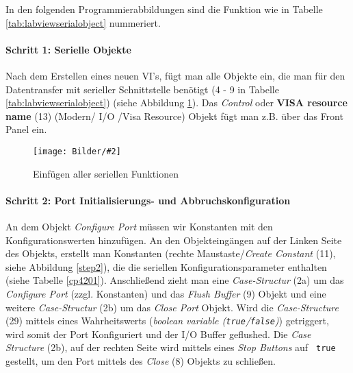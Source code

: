 \documentclass[
fontsize=12pt, 
paper=a4, 
BCOR=10mm, 
twoside=false,
 DIV=10, 
 headsepline, 
 footsepline
 ]{scrartcl}
\def\bild#1#2#3#4#5#6{%
\begin{figure}[h!] %
\centering
\texttt{[image: Bilder/\#2]}
\vspace{#3}
\caption[#4]{#5}\label{#6}
\end{figure}
}
\begin{document}





In den folgenden Programmierabbildungen sind die Funktion wie in Tabelle \ref{tab:labviewserialobject} nummeriert.

\paragraph{Schritt 1: Serielle Objekte} Nach dem Erstellen eines neuen VI's, fügt man alle Objekte ein, die man für den Datentransfer mit serieller Schnittstelle benötigt (4 - 9 in Tabelle \ref{tab:labviewserialobject}) (siehe Abbildung \ref{step1}). Das \textit{Control} oder \textbf{VISA resource name} (13) (Modern/ I/O /Visa Resource) Objekt fügt man z.B. über das Front Panel ein. 

\bild{1}
{LabVIEW_serialport/step_1_all_serial_functions_2.png}
{0em}
{Einfügen aller seriellen Funktionen}
{Einfügen aller seriellen Funktionen}
{step1}


\paragraph{Schritt 2: Port Initialisierungs- und Abbruchskonfiguration} An dem Objekt \textit{Configure Port} müssen wir Konstanten mit den Konfigurationswerten hinzufügen. An den Objekteingängen auf der Linken Seite des Objekts, erstellt man Konstanten (rechte Maustaste/\textit{Create Constant} (11), siehe Abbildung \ref{step2}), die die seriellen Konfigurationsparameter enthalten (siehe Tabelle \ref{cp4201}). Anschließend zieht man eine \textit{Case-Structur} (2a) um das \textit{Configure Port} (zzgl. Konstanten) und das \textit{Flush Buffer} (9) Objekt und eine weitere \textit{Case-Structur} (2b) um das \textit{Close Port} Objekt. Wird die \textit{Case-Structure} (29) mittels eines Wahrheitswerts (\textit{boolean variable (\texttt{true}/\texttt{false})}) getriggert, wird somit der Port Konfiguriert und der I/O Buffer geflushed. Die \textit{Case Structure} (2b), auf der rechten Seite wird mittels eines \textit{Stop Buttons} auf \texttt{ true } gestellt, um den Port mittels des \textit{Close} (8) Objekts zu schließen.\\
\end{document}
